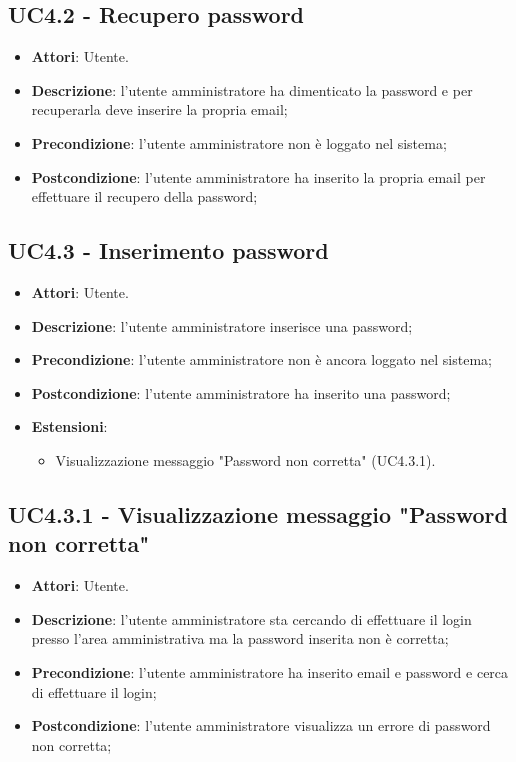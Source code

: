 \documentclass[../AnalisiDeiRequisiti.tex]{subfiles}
\begin{document}
\subsection{UC4.2 - Recupero password} 
\label{sssec:UC4.2} 
\begin{itemize} 
\item \textbf{Attori}: Utente.
\item \textbf{Descrizione}: l'utente amministratore ha dimenticato la password e per recuperarla deve inserire la propria email;
\item \textbf{Precondizione}: l'utente amministratore non è loggato nel sistema;
\item \textbf{Postcondizione}: l'utente amministratore ha inserito la propria email per effettuare il recupero della password;
\end{itemize} 
\subsection{UC4.3 - Inserimento password} 
\label{sssec:UC4.3} 
\begin{itemize} 
\item \textbf{Attori}: Utente.
\item \textbf{Descrizione}: l'utente amministratore inserisce una password;
\item \textbf{Precondizione}: l'utente amministratore non è ancora loggato nel sistema;
\item \textbf{Postcondizione}: l'utente amministratore ha inserito una password;
\item \textbf{Estensioni}:\begin{itemize}\item Visualizzazione messaggio "Password non corretta" (UC4.3.1).\end{itemize}
\end{itemize} 
\subsection{UC4.3.1 - Visualizzazione messaggio "Password non corretta"} 
\label{sssec:UC4.3.1} 
\begin{itemize} 
\item \textbf{Attori}: Utente.
\item \textbf{Descrizione}: l'utente amministratore sta cercando di effettuare il login presso l'area amministrativa ma la password inserita non è corretta;
\item \textbf{Precondizione}: l'utente amministratore ha inserito email e password e cerca di effettuare il login;
\item \textbf{Postcondizione}: l'utente amministratore visualizza un errore di password non corretta;
\end{itemize} 
\end{document}
